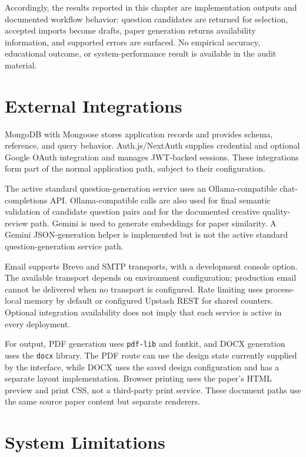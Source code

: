 Accordingly, the results reported in this chapter are implementation outputs and documented workflow behavior: question candidates are returned for selection, accepted imports become drafts, paper generation returns availability information, and supported errors are surfaced. No empirical accuracy, educational outcome, or system-performance result is available in the audit material.

\section{External Integrations}

MongoDB with Mongoose stores application records and provides schema, reference, and query behavior. Auth.js/NextAuth supplies credential and optional Google OAuth integration and manages JWT-backed sessions. These integrations form part of the normal application path, subject to their configuration.

The active standard question-generation service uses an Ollama-compatible chat-completions API. Ollama-compatible calls are also used for final semantic validation of candidate question pairs and for the documented creative quality-review path. Gemini is used to generate embeddings for paper similarity. A Gemini JSON-generation helper is implemented but is not the active standard question-generation service path.

Email supports Brevo and SMTP transports, with a development console option. The available transport depends on environment configuration; production email cannot be delivered when no transport is configured. Rate limiting uses process-local memory by default or configured Upstash REST for shared counters. Optional integration availability does not imply that each service is active in every deployment.

For output, PDF generation uses \texttt{pdf-lib} and fontkit, and DOCX generation uses the \texttt{docx} library. The PDF route can use the design state currently supplied by the interface, while DOCX uses the saved design configuration and has a separate layout implementation. Browser printing uses the paper's HTML preview and print CSS, not a third-party print service. These document paths use the same source paper content but separate renderers.

\section{System Limitations}

